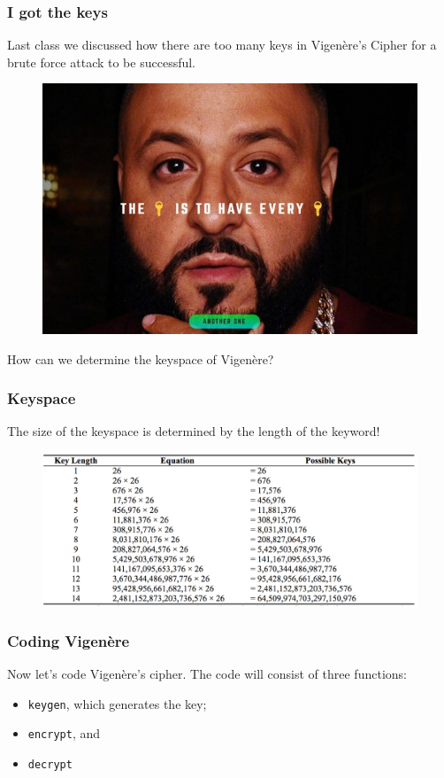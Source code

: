 \documentclass{beamer}
\newcommand{\<}{\langle}
\renewcommand{\>}{\rangle}
\begin{document}
\begin{frame}
\frametitle{I got the keys}

Last class we discussed how there are too many keys in Vigen\`{e}re's Cipher for a brute force attack to be successful.
\begin{figure}
\includegraphics[scale=.3]{IMG/keys.jpg}
\end{figure}
How can we determine the keyspace of Vigen\`{e}re?
\end{frame}


\begin{frame}
\frametitle{Keyspace}

The size of the keyspace is determined by the length of the keyword!

\begin{figure}
\includegraphics[scale=.4]{IMG/keyspace.png}
\end{figure}
\end{frame}


\begin{frame}[fragile]
\frametitle{Coding Vigen\`{e}re}

Now let's code Vigen\`{e}re's cipher. The code will consist of three functions:
\begin{itemize}
\item \verb|keygen|, which generates the key;
\item \verb|encrypt|, and
\item\verb|decrypt|
\end{itemize}
\end{frame}
\end{document}
